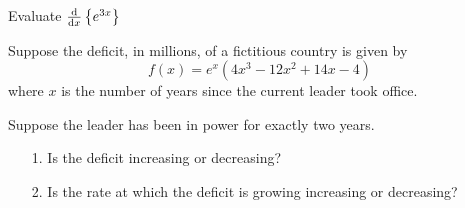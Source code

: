 \begin{frame}[t]
Evaluate $\frac{\text{d}}{\text{d}x}\left\{e^{3x}\right\}$\AnswerNo
{}
\end{frame}
\begin{frame}[t]\AnswerNo
Suppose the deficit, in millions, of a fictitious country is given by
\[f(x)=e^x(4x^3-12x^2+14x-4)\]
where $x$ is the number of years since the current leader took office.

Suppose the leader has been in power for exactly two years.
\begin{itemize}
\item[1.] Is the deficit increasing or decreasing?\pause
\vfill
\item[2.] Is the rate at which the deficit is growing increasing or decreasing?
\vfill
\end{itemize}


\end{frame}
